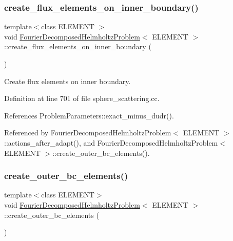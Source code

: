 \subsubsection{\texorpdfstring{create\+\_\+flux\+\_\+elements\+\_\+on\+\_\+inner\+\_\+boundary()}{create\_flux\_elements\_on\_inner\_boundary()}\hspace{0.1cm}{\footnotesize\ttfamily [2/2]}}
{\footnotesize\ttfamily template$<$class E\+L\+E\+M\+E\+NT $>$ \\
void \hyperlink{classFourierDecomposedHelmholtzProblem}{Fourier\+Decomposed\+Helmholtz\+Problem}$<$ E\+L\+E\+M\+E\+NT $>$\+::create\+\_\+flux\+\_\+elements\+\_\+on\+\_\+inner\+\_\+boundary (\begin{DoxyParamCaption}{ }\end{DoxyParamCaption})\hspace{0.3cm}{\ttfamily [private]}}



Create flux elements on inner boundary. 



Definition at line 701 of file sphere\+\_\+scattering.\+cc.



References Problem\+Parameters\+::exact\+\_\+minus\+\_\+dudr().



Referenced by Fourier\+Decomposed\+Helmholtz\+Problem$<$ E\+L\+E\+M\+E\+N\+T $>$\+::actions\+\_\+after\+\_\+adapt(), and Fourier\+Decomposed\+Helmholtz\+Problem$<$ E\+L\+E\+M\+E\+N\+T $>$\+::create\+\_\+outer\+\_\+bc\+\_\+elements().

\mbox{\label{classFourierDecomposedHelmholtzProblem_a359d402bb4aed7d83973248d82085efb}} 
\subsubsection{\texorpdfstring{create\+\_\+outer\+\_\+bc\+\_\+elements()}{create\_outer\_bc\_elements()}\hspace{0.1cm}{\footnotesize\ttfamily [1/2]}}
{\footnotesize\ttfamily template$<$class E\+L\+E\+M\+E\+NT$>$ \\
void \hyperlink{classFourierDecomposedHelmholtzProblem}{Fourier\+Decomposed\+Helmholtz\+Problem}$<$ E\+L\+E\+M\+E\+NT $>$\+::create\+\_\+outer\+\_\+bc\+\_\+elements (\begin{DoxyParamCaption}{ }\end{DoxyParamCaption})\hspace{0.3cm}{\ttfamily [private]}}



